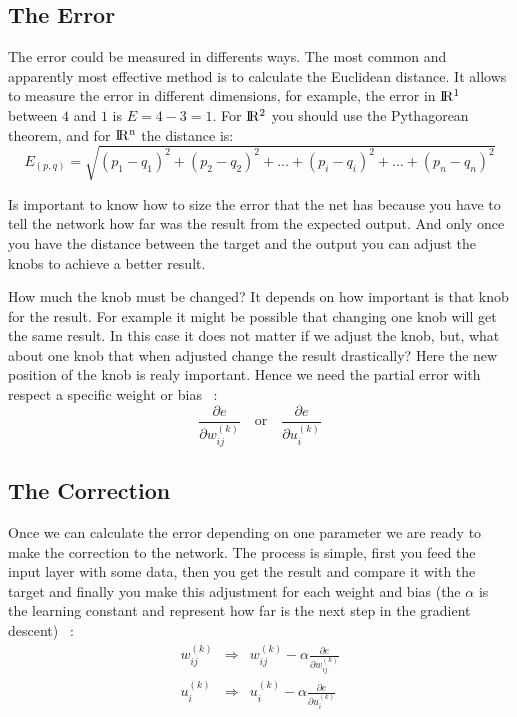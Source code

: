 \subsection{The Error}
The error could be measured in differents ways. The most common and apparently most effective method is to calculate the Euclidean distance. It allows to measure the error in different dimensions, for example, the error in $\rm I\!R^1$ between $4$ and $1$ is $E=4-3=1$. For $\rm I\!R^2$ you should use the Pythagorean theorem, and for $\rm I\!R^n$ the distance is:
\begin{equation}
  E_{(p,q)}=\sqrt{(p_1-q_1)^2+(p_2-q_2)^2+\dots+(p_i-q_i)^2+\dots+(p_n-q_n)^2}
\end{equation}

Is important to know how to size the error that the net has because you have to tell the network how far was the result from the expected output. And only once you have the distance between the target and the output you can adjust the knobs to achieve a better result.

How much the knob must be changed? It depends on how important is that knob for the result. For example it might be possible that changing one knob will get the same result. In this case it does not matter if we adjust the knob, but, what about one knob that when adjusted change the result drastically? Here the new position of the knob is realy important. Hence we need the partial error with respect a specific weight or bias ~\cite[Chapter~2]{nielsen}:
\begin{equation}
  \frac{\partial e}{\partial w^{(k)}_{ij}} \quad \textrm{or} \quad \frac{\partial e}{\partial u^{(k)}_{i}}
\end{equation}

\subsection{The Correction}
Once we can calculate the error depending on one parameter we are ready to make the correction to the network. The process is simple, first you feed the input layer with some data, then you get the result and compare it with the target and finally you make this adjustment for each weight and bias (the $\alpha$ is the learning constant and represent how far is the next step in the gradient descent) ~\cite[Chapter~7]{rojas}:
\begin{equation}
\begin{aligned}
  w^{(k)}_{ij} & \Rightarrow & w^{(k)}_{ij} - \alpha \frac{\partial e}{\partial w^{(k)}_{ij}} \\
  u^{(k)}_{i} &  \Rightarrow & u^{(k)}_{i} - \alpha \frac{\partial e}{\partial u^{(k)}_{i}}
\end{aligned}
\label{eq:corr}
\end{equation}

